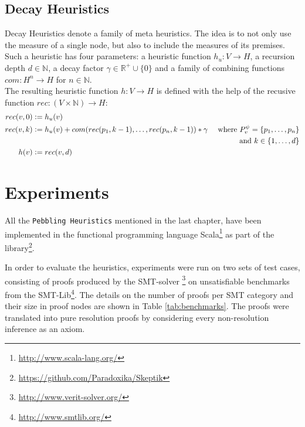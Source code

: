 \documentclass{llncs}
\newcommand{\defeq}{\mathrel{\mathop:}=}
\begin{document}
\subsection{Decay Heuristics}
\label{sec:decay}
Decay Heuristics denote a family of meta heuristics. 
The idea is to not only use the measure of a single node, but also to include the measures of its premises.
Such a heuristic has four parameters: a heuristic function $h_u: V \rightarrow H$, a recursion depth $d \in \mathbb{N}$, a decay factor $\gamma \in \mathbb{R}^+ \cup \{0\}$ and a family of combining functions $com: H^n \rightarrow H$ for $n \in \mathbb{N}$.\\
The resulting heuristic function $h: V \rightarrow H$ is defined with the help of the recusive function $rec: (V \times \mathbb{N}) \rightarrow H$:
\begin{align*}
	rec(\n,0) &\defeq h_u(\n) &\\
	rec(\n,k) &\defeq h_u(\n) + com(rec(p_1,k-1),\ldots,rec(p_n,k-1)) * \gamma & \text{ where } \Premises{\n}{\psi} = \{p_1,\ldots,p_n\}\\& & \text{ and } k \in \{1,\ldots,d\} \\
	h(\n) &\defeq rec(\n,d) &
\end{align*}

\section{Experiments} \label{sec:exp}

All the \texttt{Pebbling Heuristics} mentioned in the last chapter, have been implemented in the functional programming
language Scala\footnote{\url{http://www.scala-lang.org/}} as part of the \skeptik library\footnote{\url{https://github.com/Paradoxika/Skeptik}}.

In order to evaluate the heuristics, experiments were run on two sets of test cases, consisting of proofs produced by the SMT-solver {\veriT}\footnote{\url{http://www.verit-solver.org/}} 
on unsatisfiable benchmarks from the SMT-Lib\footnote{\url{http://www.smtlib.org/}}.
The details on the number of proofs per SMT category and their size in proof nodes are shown in Table \ref{tab:benchmarks}.  
The proofs were translated into pure resolution proofs by considering every non-resolution inference as an axiom.
\end{document}
